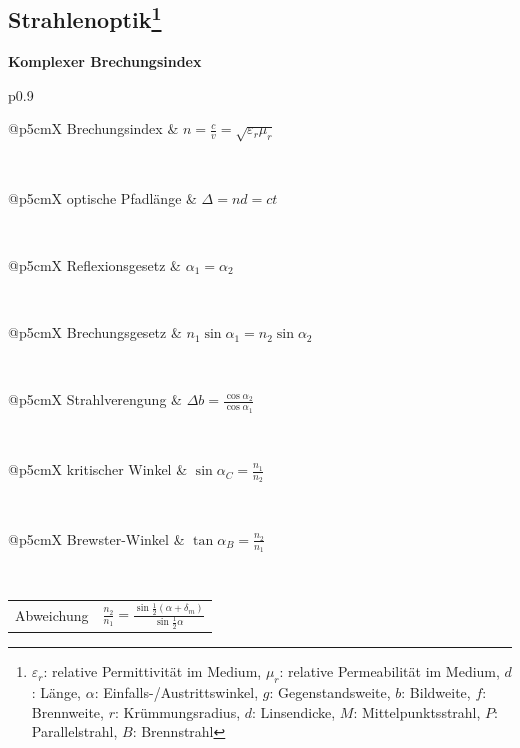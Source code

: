 \documentclass[12pt,a4paper, twoside]{article}
\makeatletter
\renewcommand{\=}[1]{\stackrel{#1}{=}}
\newcommand{\eps}{\varepsilon}
\theoremstyle{definition}
\theoremstyle{remark}
\newcommand{\concept}[2]{%
\noindent
\begin{framed}
\noindent\textbf{#1}
\par\begin{tabular}{p{0.9\linewidth}}
#2
\end{tabular}
\end{framed}
}
\newcommand{\f}[2]{%
\noindent\begin{tabularx}{\linewidth}{@{}p{5cm}X}
#1 & $#2$
\end{tabularx}}
\makeatother
\begin{document}
\subsection[Strahlenoptik]{Strahlenoptik\let\thefootnote\relax\footnote{$\eps_r$: relative Permittivität im Medium, $\mu_r$: relative Permeabilität im Medium, $d$: Länge, $\alpha$: Einfalls-/Austrittswinkel, $g$: Gegenstandsweite, $b$: Bildweite, $f$: Brennweite, $r$: Krümmungsradius, $d$: Linsendicke, $M$: Mittelpunktsstrahl, $P$: Parallelstrahl, $B$: Brennstrahl}}

\concept{Komplexer Brechungsindex}{
\f{Brechungsindex}{n = \frac{c}{v} = \sqrt{\varepsilon_r \mu_r}}\\
\f{optische Pfadlänge}{\Delta = nd = ct}\\
\f{Reflexionsgesetz}{\alpha_1 = \alpha_2}\\
\f{Brechungsgesetz}{n_1 \sin \alpha_1 = n_2 \sin \alpha_2}\\
\f{Strahlverengung}{\Delta b = \frac{\cos \alpha_2}{\cos \alpha_1}}\\
\f{kritischer Winkel}{\sin \alpha_C = \frac{n_1}{n_2}}\\
\f{Brewster-Winkel}{\tan \alpha_B = \frac{n_2}{n_1}}\\
\f{Abweichung}{\frac{n_2}{n_1} = \frac{\sin \frac{1}{2}(\alpha + \delta_m)}{\sin \frac{1}{2} \alpha}}
}
\end{document}
